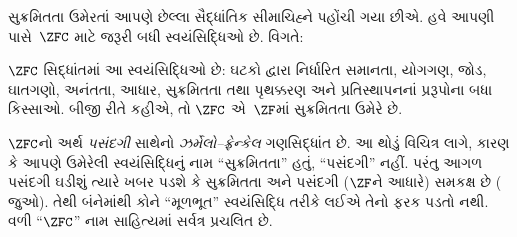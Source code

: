 \documentclass[../../../include/open-logic-section]{subfiles}
\begin{document}

સુક્રમિતતા ઉમેરતાં આપણે છેલ્લા સૈદ્ધાંતિક
સીમાચિહ્ને પહોંચી ગયા છીએ. હવે આપણી પાસે~$\ZFC$
માટે જરૂરી બધી સ્વયંસિદ્ધિઓ છે. વિગતે:

\begin{defn}
$\ZFC$ સિદ્ધાંતમાં આ સ્વયંસિદ્ધિઓ છે: ઘટકો દ્વારા
નિર્ધારિત સમાનતા, યોગગણ, જોડ, ઘાતગણો, અનંતતા,
આધાર, સુક્રમિતતા તથા પૃથક્કરણ અને પ્રતિસ્થાપનનાં
પ્રરૂપોના બધા કિસ્સાઓ.
બીજી રીતે કહીએ, તો $\ZFC$ એ~$\ZF$માં સુક્રમિતતા
ઉમેરે છે.
\end{defn}

$\ZFC$નો અર્થ \emph{પસંદગી} સાથેનો
\emph{ઝર્મેલો--ફ્રેન્કેલ} ગણસિદ્ધાંત છે.
આ થોડું વિચિત્ર લાગે, કારણ કે આપણે ઉમેરેલી
સ્વયંસિદ્ધિનું નામ ``સુક્રમિતતા'' હતું, ``પસંદગી''
નહીં. પરંતુ આગળ {પસંદગી} ઘડીશું ત્યારે ખબર પડશે કે
સુક્રમિતતા અને પસંદગી ($\ZF$ને આધારે) સમકક્ષ છે
( જુઓ).
તેથી બંનેમાંથી કોને ``મૂળભૂત'' સ્વયંસિદ્ધિ તરીકે લઈએ
તેનો ફરક પડતો નથી. વળી ``$\ZFC$'' નામ
સાહિત્યમાં સર્વત્ર પ્રચલિત છે.
\end{document}
